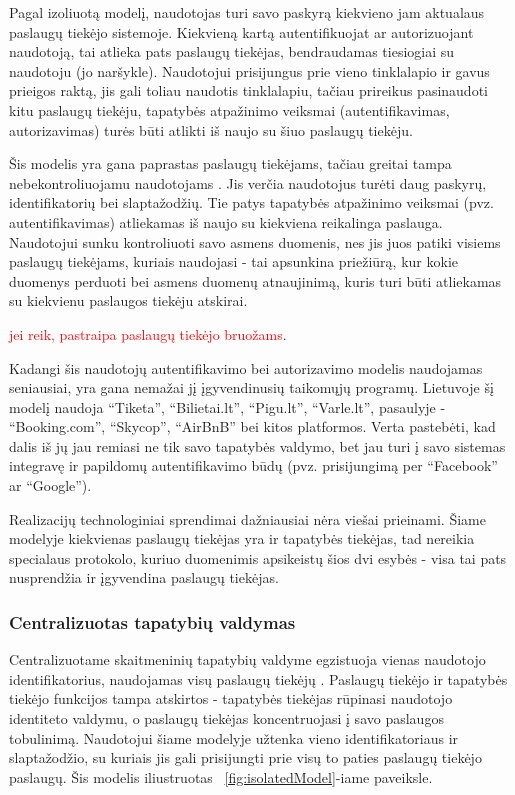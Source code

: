 Pagal izoliuotą modelį, naudotojas turi savo paskyrą kiekvieno jam aktualaus paslaugų tiekėjo sistemoje. Kiekvieną kartą autentifikuojat ar autorizuojant
naudotoją, tai atlieka pats paslaugų tiekėjas, bendraudamas tiesiogiai su naudotoju (jo naršykle). Naudotojui prisijungus prie vieno tinklalapio ir gavus
prieigos raktą, jis gali toliau naudotis tinklalapiu, tačiau prireikus pasinaudoti kitu paslaugų tiekėju, tapatybės atpažinimo veiksmai (autentifikavimas, autorizavimas)
turės būti atlikti iš naujo su šiuo paslaugų tiekėju.

Šis modelis yra gana paprastas paslaugų tiekėjams, tačiau greitai tampa
nebekontroliuojamu naudotojams \cite{Josang2005}. Jis verčia naudotojus turėti daug paskyrų, identifikatorių bei slaptažodžių.
Tie patys tapatybės atpažinimo veiksmai (pvz. autentifikavimas) atliekamas iš naujo su kiekviena reikalinga paslauga. Naudotojui
sunku kontroliuoti savo asmens duomenis, nes jis juos patiki visiems paslaugų tiekėjams, kuriais naudojasi - tai apsunkina 
priežiūrą, kur kokie duomenys perduoti bei asmens duomenų atnaujinimą, kuris turi būti atliekamas su kiekvienu paslaugos tiekėju atskirai.

\textcolor{red}{jei reik, pastraipa paslaugų tiekėjo bruožams}.


Kadangi šis naudotojų autentifikavimo bei autorizavimo modelis naudojamas seniausiai,
yra gana nemažai jį įgyvendinusių taikomųjų programų. Lietuvoje šį modelį naudoja
\enquote{Tiketa}, \enquote{Bilietai.lt}, \enquote{Pigu.lt},
\enquote{Varle.lt}, pasaulyje - \enquote{Booking.com}, \enquote{Skycop}, \enquote{AirBnB} bei kitos platformos. Verta
pastebėti, kad dalis iš jų jau remiasi ne tik savo tapatybės valdymo, bet jau turi į savo sistemas integravę ir papildomų autentifikavimo būdų
(pvz. prisijungimą per \enquote{Facebook} ar \enquote{Google}).

Realizacijų technologiniai sprendimai dažniausiai nėra viešai prieinami.
Šiame modelyje kiekvienas paslaugų tiekėjas yra ir tapatybės tiekėjas, tad nereikia
specialaus protokolo, kuriuo duomenimis apsikeistų šios dvi esybės - visa tai pats nusprendžia
ir įgyvendina paslaugų tiekėjas.

\subsubsection{Centralizuotas tapatybių valdymas}

Centralizuotame skaitmeninių tapatybių valdyme egzistuoja vienas naudotojo identifikatorius,
naudojamas visų paslaugų tiekėjų \cite{Josang2005}. Paslaugų tiekėjo ir tapatybės tiekėjo funkcijos tampa atskirtos - 
tapatybės tiekėjas rūpinasi naudotojo identiteto valdymu, o paslaugų tiekėjas koncentruojasi į savo paslaugos tobulinimą.
Naudotojui šiame modelyje užtenka vieno identifikatoriaus ir slaptažodžio, su kuriais jis gali prisijungti prie visų to paties
paslaugų tiekėjo paslaugų. Šis modelis iliustruotas ~\ref{fig:isolatedModel}-iame paveiksle.

